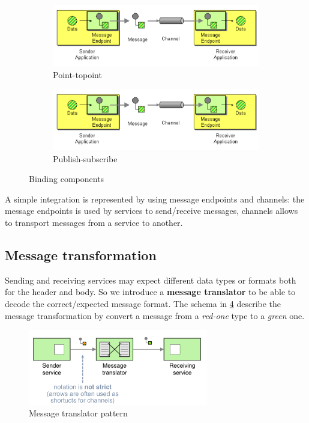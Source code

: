 \documentclass[10pt,a4paper]{report}
\begin{document}
\begin{figure}
	\centering
	\begin{subfigure}{.5\textwidth}
		\centering
		\includegraphics[width=.9\linewidth]{image40}
		\caption{Point-topoint}
		\label{image39}
	\end{subfigure}%
	\begin{subfigure}{.5\textwidth}
		\centering
		\includegraphics[width=.9\linewidth]{image40}
		\caption{Publish-subscribe}
		\label{image40}
	\end{subfigure}
	\caption{Binding components}
	\label{image40a}
\end{figure}

A simple integration is represented by using message endpoints and channels: the message endpoints is used by services to send/receive messages, channels allows to transport messages from a service to another.

\subsection{Message transformation}
Sending and receiving services may expect different data types or formats both for the header and body. So we introduce a \textbf{message translator} to be able to decode the correct/expected message format. The schema in \ref{image41} describe the message transformation by convert a message from a \textit{red-one} type to a \textit{green} one.
  \begin{figure}[h]
	\centering
	\includegraphics[width=0.7\textwidth]{image41}
	\caption{Message translator pattern}
	\label{image41}
\end{figure}
\end{document}
